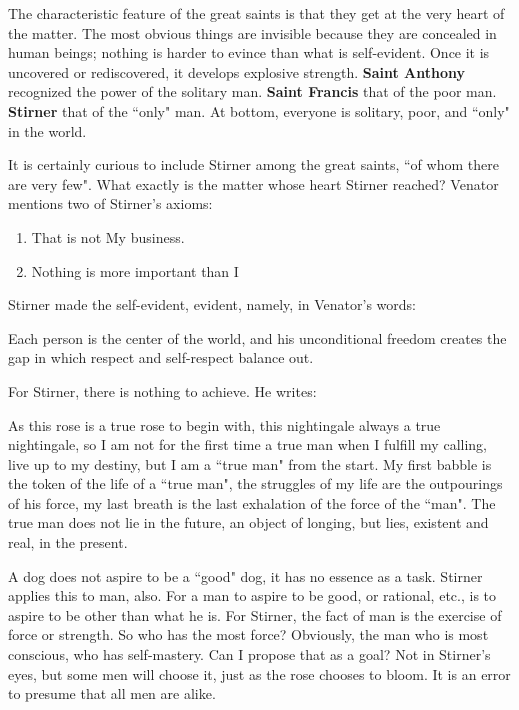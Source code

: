 \begin{quotex}
The characteristic feature of the great saints is that they get at the very heart of the matter. The most obvious things are invisible because they are concealed in human beings; nothing is harder to evince than what is self-evident. Once it is uncovered or rediscovered, it develops explosive strength. \textbf{Saint Anthony} recognized the power of the solitary man. \textbf{Saint Francis} that of the poor man. \textbf{Stirner} that of the ``only" man. At bottom, everyone is solitary, poor, and ``only" in the world. 

\end{quotex}
It is certainly curious to include Stirner among the great saints, ``of whom there are very few". What exactly is the matter whose heart Stirner reached? Venator mentions two of Stirner's axioms:

\begin{enumerate}
\item That is not My business. 
\item Nothing is more important than I 
\end{enumerate}
Stirner made the self-evident, evident, namely, in Venator's words:

\begin{quotex}
Each person is the center of the world, and his unconditional freedom creates the gap in which respect and self-respect balance out. 

\end{quotex}
For Stirner, there is nothing to achieve. He writes:

\begin{quotex}
As this rose is a true rose to begin with, this nightingale always a true nightingale, so I am not for the first time a true man when I fulfill my calling, live up to my destiny, but I am a ``true man" from the start. My first babble is the token of the life of a ``true man", the struggles of my life are the outpourings of his force, my last breath is the last exhalation of the force of the ``man". The true man does not lie in the future, an object of longing, but lies, existent and real, in the present. 

\end{quotex}
A dog does not aspire to be a ``good" dog, it has no essence as a task. Stirner applies this to man, also. For a man to aspire to be good, or rational, etc., is to aspire to be other than what he is. For Stirner, the fact of man is the exercise of force or strength. So who has the most force? Obviously, the man who is most conscious, who has self-mastery. Can I propose that as a goal? Not in Stirner's eyes, but some men will choose it, just as the rose chooses to bloom. It is an error to presume that all men are alike.

